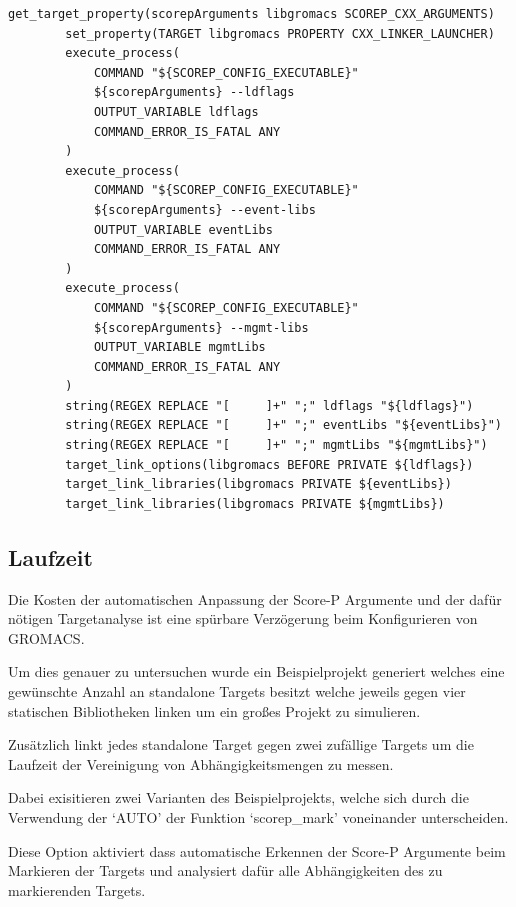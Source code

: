 \documentclass[german,proseminar,hyperref,utf8]{zihpub}
\begin{document}
    \begin{lstlisting}[caption=Workaround für Score-P Bug, gobble=8, showstringspaces=false, basicstyle=\small]
        get_target_property(scorepArguments libgromacs SCOREP_CXX_ARGUMENTS)
        set_property(TARGET libgromacs PROPERTY CXX_LINKER_LAUNCHER)
        execute_process(
            COMMAND "${SCOREP_CONFIG_EXECUTABLE}"
            ${scorepArguments} --ldflags
            OUTPUT_VARIABLE ldflags
            COMMAND_ERROR_IS_FATAL ANY
        )
        execute_process(
            COMMAND "${SCOREP_CONFIG_EXECUTABLE}"
            ${scorepArguments} --event-libs
            OUTPUT_VARIABLE eventLibs
            COMMAND_ERROR_IS_FATAL ANY
        )
        execute_process(
            COMMAND "${SCOREP_CONFIG_EXECUTABLE}"
            ${scorepArguments} --mgmt-libs
            OUTPUT_VARIABLE mgmtLibs
            COMMAND_ERROR_IS_FATAL ANY
        )
        string(REGEX REPLACE "[     ]+" ";" ldflags "${ldflags}")
        string(REGEX REPLACE "[     ]+" ";" eventLibs "${eventLibs}")
        string(REGEX REPLACE "[     ]+" ";" mgmtLibs "${mgmtLibs}")
        target_link_options(libgromacs BEFORE PRIVATE ${ldflags})
        target_link_libraries(libgromacs PRIVATE ${eventLibs})
        target_link_libraries(libgromacs PRIVATE ${mgmtLibs})
    \end{lstlisting}

    \subsection{Laufzeit}
    Die Kosten der automatischen Anpassung der Score-P Argumente und der dafür nötigen Targetanalyse
    ist eine spürbare Verzögerung beim Konfigurieren von GROMACS.

    Um dies genauer zu untersuchen wurde ein Beispielprojekt generiert welches eine gewünschte
    Anzahl an standalone Targets besitzt welche jeweils gegen vier statischen Bibliotheken linken
    um ein großes Projekt zu simulieren.

    Zusätzlich linkt jedes standalone Target gegen zwei zufällige Targets um die Laufzeit der
    Vereinigung von Abhängigkeitsmengen zu messen.

    Dabei exisitieren zwei Varianten des Beispielprojekts, welche sich durch die Verwendung der
    `AUTO' der Funktion `scorep\_mark' voneinander unterscheiden.

    Diese Option aktiviert dass automatische Erkennen der Score-P Argumente beim Markieren der Targets
    und analysiert dafür alle Abhängigkeiten des zu markierenden Targets.
\end{document}
